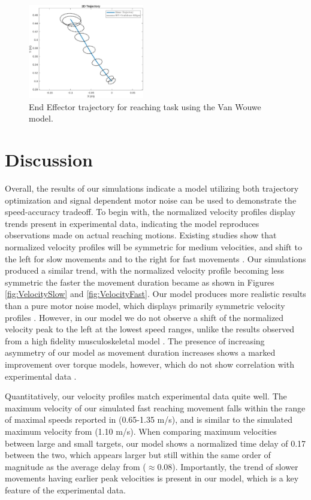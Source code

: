 \documentclass[letterpaper, 10pt, conference]{ieeeconf}
\begin{document}
\begin{figure}[h]
    \centering
    \includegraphics[width=0.45\textwidth]{demo_traj_small.jpg}
    \caption{End Effector trajectory for reaching task using the Van Wouwe model.}
    \label{fig:demo_position}
\end{figure}

\section{Discussion}
Overall, the results of our simulations indicate a model utilizing both trajectory optimization and signal dependent motor noise can be used to demonstrate the speed-accuracy tradeoff. To begin with, the normalized velocity profiles display trends present in experimental data, indicating the model reproduces observations made  on actual reaching motions. Existing studies show that normalized velocity profiles will be symmetric for medium velocities, and shift to the left for slow movements and to the right for fast movements \cite{c9}\cite{c10}. Our simulations produced a similar trend, with the normalized velocity profile becoming less symmetric the faster the movement duration became as shown in Figures \ref{fig:VelocitySlow} and \ref{fig:VelocityFast}. Our model produces more realistic results than a pure motor noise model, which displays primarily symmetric velocity profiles \cite{c2}. However, in our model we do not observe a shift of the normalized velocity peak to the left at the lowest speed ranges, unlike the results observed from a high fidelity musculoskeletal model \cite{c5}. The presence of increasing asymmetry of our model as movement duration increases shows a marked improvement over torque models, however, which do not show correlation with experimental data \cite{5}. 

Quantitatively, our velocity profiles match experimental data quite well. The maximum velocity of our simulated fast reaching movement falls within the range of maximal speeds reported in \cite{c11} (0.65-1.35 m/s), and is similar to the simulated maximum velocity from \cite{c5} (1.10 m/s). When comparing maximum velocities between large and small targets, our model shows a normalized time delay of 0.17 between the two, which appears larger but still within the same order of magnitude as the average delay from \cite{c11} ($\approx 0.08$). Importantly, the trend of slower movements having earlier peak velocities is present in our model, which is a key feature of the experimental data.
\end{document}
